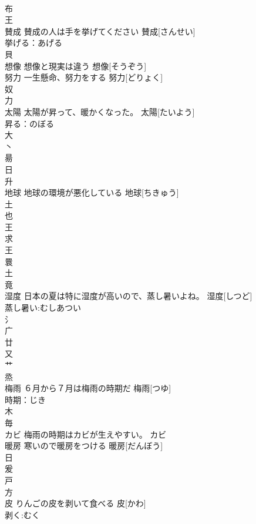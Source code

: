 \documentclass[8pt]{extreport}
\begin{document}
\begin{CJK}{UTF8}{min}
\\	布 
\\	王 
\\	賛成	賛成の人は手を挙げてください	賛成[さんせい]			
\\	挙げる：あげる
\\	貝 
\\	想像	想像と現実は違う	想像[そうぞう]			
\\	努力	一生懸命、努力をする	努力[どりょく]			
\\	奴 
\\	力 
\\	太陽	太陽が昇って、暖かくなった。	太陽[たいよう]			
\\	昇る：のぼる
\\	大 
\\	丶 
\\	昜 
\\	日 
\\	升 
\\	地球	地球の環境が悪化している	地球[ちきゅう]			
\\	土 
\\	也 
\\	王 
\\	求 
\\	王 
\\	睘 
\\	土 
\\	竟 
\\	湿度	日本の夏は特に湿度が高いので、蒸し暑いよね。	湿度[しつど]			
\\	蒸し暑い:むしあつい
\\	氵 
\\	广 
\\	廿 
\\	又 
\\	艹 
\\	烝 
\\	梅雨	６月から７月は梅雨の時期だ	梅雨[つゆ]			
\\	時期：じき
\\	木 
\\	毎 
\\	カビ	梅雨の時期はカビが生えやすい。	カビ			
\\	暖房	寒いので暖房をつける	暖房[だんぼう]			
\\	日 
\\	爰 
\\	戸 
\\	方 
\\	皮	りんごの皮を剥いて食べる	皮[かわ]			
\\	剥く:むく

\end{CJK}
\end{document}
